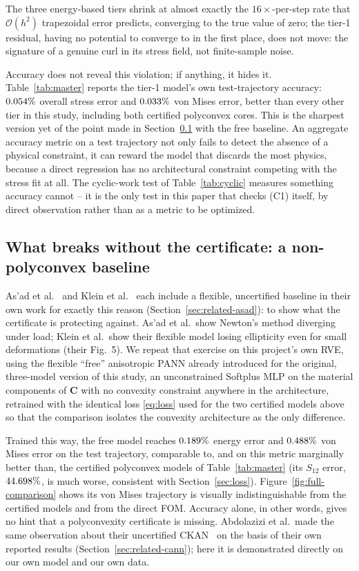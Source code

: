 \documentclass[10pt,a4paper]{article}
\begin{document}
The three energy-based tiers shrink at almost exactly the $16\times$-per-step
rate that $\mathcal O(h^2)$ trapezoidal error predicts, converging to
the true value of zero; the tier-1 residual, having no potential to
converge to in the first place, does not move: the signature of a
genuine curl in its stress field, not finite-sample noise.

Accuracy does not reveal this violation; if anything, it hides it.
Table~\ref{tab:master} reports the tier-1 model's own test-trajectory accuracy: $0.054\%{}$ overall stress error
and $0.033\%{}$ von Mises error, better than every
other tier in this study, including both certified polyconvex cores.
This is the sharpest version yet of the point made in
Section~\ref{sec:non-polyconvex} with the free baseline. An aggregate
accuracy metric on a test trajectory not only fails to detect the
absence of a physical constraint, it can reward the model that discards
the most physics, because a direct regression has no architectural
constraint competing with the stress fit at all. The cyclic-work test
of Table~\ref{tab:cyclic} measures something accuracy cannot -- it is the
only test in this paper that checks (C1) itself, by direct observation
rather than as a metric to be optimized.

\subsection{What breaks without the certificate: a non-polyconvex baseline}
\label{sec:non-polyconvex}
As'ad et al.~\cite{Asad2022} and Klein et al.~\cite{Klein2022} each
include a flexible, uncertified baseline in their own work for exactly
this reason (Section~\ref{sec:related-asad}): to show what the
certificate is protecting against. As'ad et al.\ show Newton's method
diverging under load; Klein et al.\ show their flexible model losing
ellipticity even for small deformations (their Fig.~5). We repeat that
exercise on this project's own RVE, using the flexible ``free''
anisotropic PANN already introduced for the original, three-model
version of this study, an unconstrained Softplus MLP on the material
components of $\bm C$ with no convexity constraint anywhere in the
architecture, retrained with the identical loss \eqref{eq:loss} used
for the two certified models above so that the comparison isolates the
convexity architecture as the only difference.

Trained this way, the free model reaches $0.189\%$
energy error and $0.488\%{}$ von Mises error on the
test trajectory, comparable to, and on this metric marginally
better than, the certified polyconvex models of Table~\ref{tab:master}
(its $S_{12}$ error, $44.698\%$, is much worse, consistent
with Section~\ref{sec:loss}). Figure~\ref{fig:full-comparison} shows its
von Mises trajectory is visually indistinguishable from the certified
models and from the direct FOM. Accuracy alone, in other words, gives no
hint that a polyconvexity certificate is missing. Abdolazizi et al.\
made the same observation about their uncertified
CKAN~\cite{Abdolazizi2025} on the basis of their own reported results
(Section~\ref{sec:related-cann}); here it is demonstrated directly on
our own model and our own data.
\end{document}
